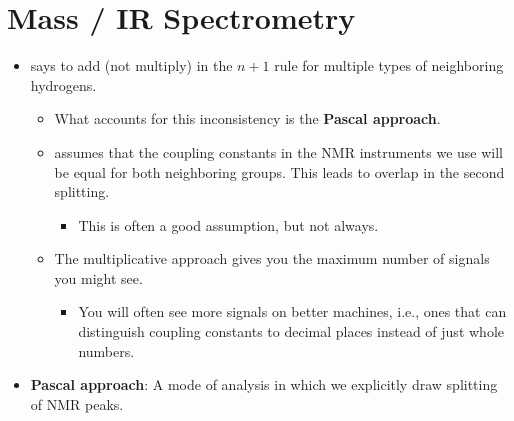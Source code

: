 \documentclass[../notes.tex]{subfiles}
\begin{document}
\section{Mass / IR Spectrometry}
\begin{itemize}
    \item {}\textcite{bib:SolomonsEtAl} says to add (not multiply) in the $n+1$ rule for multiple types of neighboring hydrogens.
    \begin{itemize}
        \item What accounts for this inconsistency is the \textbf{Pascal approach}.
        \item \textcite{bib:SolomonsEtAl} assumes that the coupling constants in the NMR instruments we use will be equal for both neighboring groups. This leads to overlap in the second splitting.
        \begin{itemize}
            \item This is often a good assumption, but not always.
        \end{itemize}
        \item The multiplicative approach gives you the maximum number of signals you might see.
        \begin{itemize}
            \item You will often see more signals on better machines, i.e., ones that can distinguish coupling constants to decimal places instead of just whole numbers.
        \end{itemize}
    \end{itemize}
    \item \textbf{Pascal approach}: A mode of analysis in which we explicitly draw splitting of NMR peaks.
    \begin{figure}[h!]
        \centering
        \footnotesize
        \begin{subfigure}[b]{0.49\linewidth}
            \centering
\end{subfigure}
\end{figure}
\end{itemize}
\end{document}
